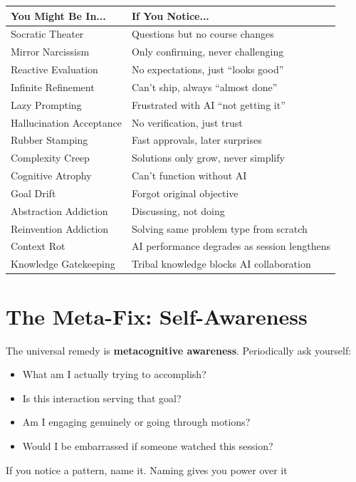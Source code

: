 \begin{center}
\begin{tabular}{|l|l|}
\hline
\textbf{You Might Be In...} & \textbf{If You Notice...} \\
\hline
Socratic Theater & Questions but no course changes \\
Mirror Narcissism & Only confirming, never challenging \\
Reactive Evaluation & No expectations, just ``looks good'' \\
Infinite Refinement & Can't ship, always ``almost done'' \\
Lazy Prompting & Frustrated with AI ``not getting it'' \\
Hallucination Acceptance & No verification, just trust \\
Rubber Stamping & Fast approvals, later surprises \\
Complexity Creep & Solutions only grow, never simplify \\
Cognitive Atrophy & Can't function without AI \\
Goal Drift & Forgot original objective \\
Abstraction Addiction & Discussing, not doing \\
Reinvention Addiction & Solving same problem type from scratch \\
Context Rot & AI performance degrades as session lengthens \\
Knowledge Gatekeeping & Tribal knowledge blocks AI collaboration \\
\hline
\end{tabular}
\end{center}

\section{The Meta-Fix: Self-Awareness}

The universal remedy is \textbf{metacognitive awareness}. Periodically ask yourself:

\begin{itemize}
    \item What am I actually trying to accomplish?
    \item Is this interaction serving that goal?
    \item Am I engaging genuinely or going through motions?
    \item Would I be embarrassed if someone watched this session?
\end{itemize}

If you notice a pattern, name it. Naming gives you power over it

